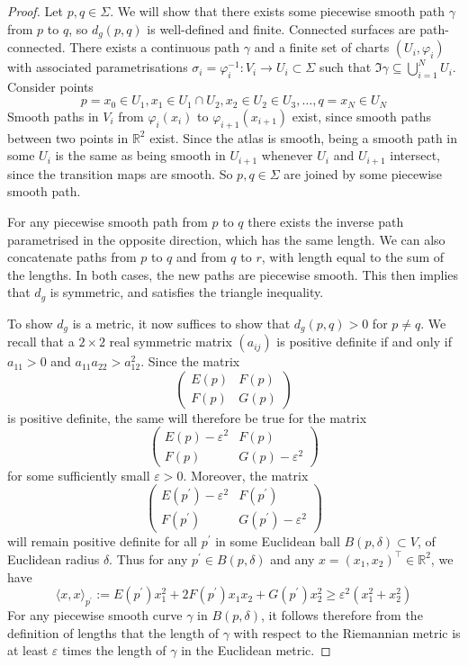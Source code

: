 \documentclass[a4paper]{article}
\begin{document}
\begin{proof}
	Let \( p, q \in \Sigma \).
	We will show that there exists some piecewise smooth path \( \gamma \) from \( p \) to \( q \), so \( d_g(p,q) \) is well-defined and finite.
	Connected surfaces are path-connected.
	There exists a continuous path \( \gamma \) and a finite set of charts \( (U_i, \varphi_i) \) with associated parametrisations \( \sigma_i = \varphi_i^{-1} \colon V_i \to U_i \subset \Sigma \) such that \( \Im \gamma \subseteq \bigcup_{i=1}^N U_i \).
	Consider points
	\[
		p = x_0 \in U_1, x_1 \in U_1 \cap U_2, x_2 \in U_2 \in U_3, \dots, q = x_N \in U_N
	\]
	Smooth paths in \( V_i \) from \( \varphi_i(x_i) \) to \( \varphi_{i+1}(x_{i+1}) \) exist, since smooth paths between two points in \( \mathbb R^2 \) exist.
	Since the atlas is smooth, being a smooth path in some \( U_i \) is the same as being smooth in \( U_{i+1} \) whenever \( U_i \) and \( U_{i+1} \) intersect, since the transition maps are smooth.
	So \( p,q \in \Sigma \) are joined by some piecewise smooth path.

	For any piecewise smooth path from \( p \) to \( q \) there exists the inverse path parametrised in the opposite direction, which has the same length.
	We can also concatenate paths from \( p \) to \( q \) and from \( q \) to \( r \), with length equal to the sum of the lengths.
	In both cases, the new paths are piecewise smooth.
	This then implies that \( d_g \) is symmetric, and satisfies the triangle inequality.

	To show \( d_g \) is a metric, it now suffices to show that \( d_g(p,q) > 0 \) for \( p \neq q \). We recall that a $2 \times 2$ real symmetric matrix $\left(a_{i j}\right)$ is positive definite if and only if $a_{11}>0$ and $a_{11} a_{22}>a_{12}^2$. Since the matrix
	\[
	\begin{pmatrix}
		E(p) & F(p) \\
	F(p) & G(p)
	\end{pmatrix}
	\]
	is positive definite, the same will therefore be true for the matrix
	\[
	\begin{pmatrix}
		E(p)-\varepsilon^2 & F(p) \\
		F(p) & G(p)-\varepsilon^2
	\end{pmatrix}
	\]
	for some sufficiently small $\varepsilon>0$. Moreover, the matrix
	\[
	\begin{pmatrix}
		E\left(p^{\prime}\right)-\varepsilon^2 & F\left(p^{\prime}\right) \\
	F\left(p^{\prime}\right) & G\left(p^{\prime}\right)-\varepsilon^2
	\end{pmatrix}
	\]
	will remain positive definite for all $p^{\prime}$ in some Euclidean ball $B(p, \delta) \subset V$, of Euclidean radius $\delta$. Thus for any $p^{\prime} \in B(p, \delta)$ and any $ x=\left(x_1, x_2\right)^\top \in \mathbb{R}^2$, we have
	\[
	\langle x,  x\rangle_{p^{\prime}}:=E\left(p^{\prime}\right) x_1^2+2 F\left(p^{\prime}\right) x_1 x_2+G\left(p^{\prime}\right) x_2^2 \geq \varepsilon^2\left(x_1^2+x_2^2\right)
	\]
	For any piecewise smooth curve $\gamma$ in $B(p, \delta)$, it follows therefore from the definition of lengths that the length of $\gamma$ with respect to the Riemannian metric is at least $\varepsilon$ times the length of $\gamma$ in the Euclidean metric.


\end{proof}
\end{document}
